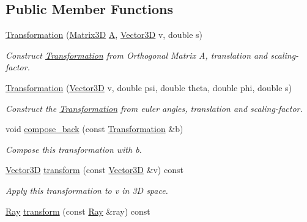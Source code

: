 \subsection*{Public Member Functions}
\begin{DoxyCompactItemize}
\item 
\mbox{\hyperlink{classlinalg_1_1Transformation_a92fd6d6de1cf518d6316219339e42eff}{Transformation}} (\mbox{\hyperlink{classlinalg_1_1Matrix3D}{Matrix3D}} \mbox{\hyperlink{classlinalg_1_1Transformation_a24a75d79007bc9b5c5f32c042fb4332b}{A}}, \mbox{\hyperlink{classVector3D}{Vector3D}} v, double s)
\begin{DoxyCompactList}\small\item\em Construct \mbox{\hyperlink{classlinalg_1_1Transformation}{Transformation}} from Orthogonal Matrix A, translation and scaling-\/factor. \end{DoxyCompactList}\item 
\mbox{\hyperlink{classlinalg_1_1Transformation_ac6339d874eca2be8ae458a10e43f644e}{Transformation}} (\mbox{\hyperlink{classVector3D}{Vector3D}} v, double psi, double theta, double phi, double s)
\begin{DoxyCompactList}\small\item\em Construct the \mbox{\hyperlink{classlinalg_1_1Transformation}{Transformation}} from euler angles, translation and scaling-\/factor. \end{DoxyCompactList}\item 
void \mbox{\hyperlink{classlinalg_1_1Transformation_aa6e43ea1e47c3929d4903dce85a5dbd5}{compose\+\_\+back}} (const \mbox{\hyperlink{classlinalg_1_1Transformation}{Transformation}} \&b)
\begin{DoxyCompactList}\small\item\em Compose this transformation with b. \end{DoxyCompactList}\item 
\mbox{\hyperlink{classVector3D}{Vector3D}} \mbox{\hyperlink{classlinalg_1_1Transformation_a069ec396b1a3addcb3400797a505b759}{transform}} (const \mbox{\hyperlink{classVector3D}{Vector3D}} \&v) const
\begin{DoxyCompactList}\small\item\em Apply this transformation to v in 3D space. \end{DoxyCompactList}\item 
\mbox{\hyperlink{classRay}{Ray}} \mbox{\hyperlink{classlinalg_1_1Transformation_a2f0c817ed97307ec777f46a37810421e}{transform}} (const \mbox{\hyperlink{classRay}{Ray}} \&ray) const

\end{DoxyCompactItemize}
